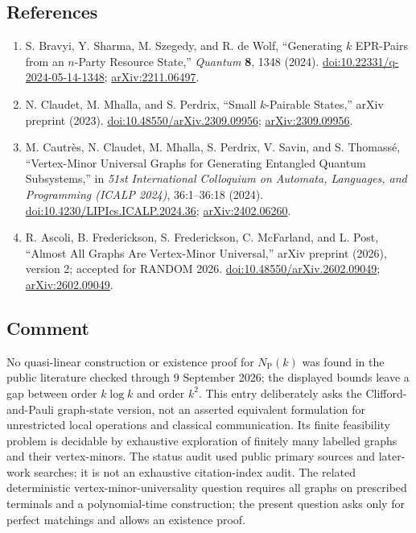 \subsection*{References}

\begin{enumerate}[label={},leftmargin=4.8em,labelsep=0.5em]
  \footnotesize
  \item[\textup{[BSSW24]}]\label{ref:gpp-epr}
  S. Bravyi, Y. Sharma, M. Szegedy, and R. de Wolf, ``Generating $k$ EPR-Pairs from an $n$-Party Resource State,'' \emph{Quantum} \textbf{8}, 1348 (2024). \href{https://doi.org/10.22331/q-2024-05-14-1348}{doi:10.22331/q-2024-05-14-1348}; \href{https://arxiv.org/abs/2211.06497}{arXiv:2211.06497}.

  \item[\textup{[CMP23]}]\label{ref:gpp-small-pairable}
  N. Claudet, M. Mhalla, and S. Perdrix, ``Small $k$-Pairable States,'' arXiv preprint (2023). \href{https://doi.org/10.48550/arXiv.2309.09956}{doi:10.48550/arXiv.2309.09956}; \href{https://arxiv.org/abs/2309.09956}{arXiv:2309.09956}.

  \item[\textup{[CCM+24]}]\label{ref:gpp-universal}
  M. Cautrès, N. Claudet, M. Mhalla, S. Perdrix, V. Savin, and S. Thomassé, ``Vertex-Minor Universal Graphs for Generating Entangled Quantum Subsystems,'' in \emph{51st International Colloquium on Automata, Languages, and Programming (ICALP 2024)}, 36:1–36:18 (2024). \href{https://doi.org/10.4230/LIPIcs.ICALP.2024.36}{doi:10.4230/LIPIcs.ICALP.2024.36}; \href{https://arxiv.org/abs/2402.06260}{arXiv:2402.06260}.

  \item[\textup{[AFF+26]}]\label{ref:gpp-random}
  R. Ascoli, B. Frederickson, S. Frederickson, C. McFarland, and L. Post, ``Almost All Graphs Are Vertex-Minor Universal,'' arXiv preprint (2026), version 2; accepted for RANDOM 2026. \href{https://doi.org/10.48550/arXiv.2602.09049}{doi:10.48550/arXiv.2602.09049}; \href{https://arxiv.org/abs/2602.09049}{arXiv:2602.09049}.
\end{enumerate}

\subsection*{Comment}

No quasi-linear construction or existence proof for $N_{\mathrm P}(k)$ was found in the public literature checked through 9 September 2026; the displayed bounds leave a gap between order $k\log k$ and order $k^2$. This entry deliberately asks the Clifford-and-Pauli graph-state version, not an asserted equivalent formulation for unrestricted local operations and classical communication. Its finite feasibility problem is decidable by exhaustive exploration of finitely many labelled graphs and their vertex-minors. The status audit used public primary sources and later-work searches; it is not an exhaustive citation-index audit. The related deterministic vertex-minor-universality question requires all graphs on prescribed terminals and a polynomial-time construction; the present question asks only for perfect matchings and allows an existence proof.


